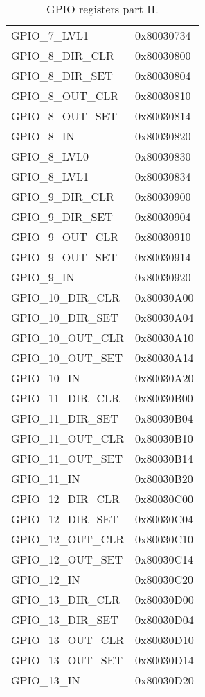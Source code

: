 \begin{table}[h]
{\begin{small}
\begin{center}
\begin{tabular}{l | l}
GPIO\_7\_LVL1       & 0x80030734\\
GPIO\_8\_DIR\_CLR    & 0x80030800\\
GPIO\_8\_DIR\_SET    & 0x80030804\\
GPIO\_8\_OUT\_CLR    & 0x80030810\\
GPIO\_8\_OUT\_SET    & 0x80030814\\
GPIO\_8\_IN         & 0x80030820\\
GPIO\_8\_LVL0       & 0x80030830\\
GPIO\_8\_LVL1       & 0x80030834\\
GPIO\_9\_DIR\_CLR    & 0x80030900\\
GPIO\_9\_DIR\_SET    & 0x80030904\\
GPIO\_9\_OUT\_CLR    & 0x80030910\\
GPIO\_9\_OUT\_SET    & 0x80030914\\
GPIO\_9\_IN         & 0x80030920\\
GPIO\_10\_DIR\_CLR   & 0x80030A00\\
GPIO\_10\_DIR\_SET   & 0x80030A04\\
GPIO\_10\_OUT\_CLR   & 0x80030A10\\
GPIO\_10\_OUT\_SET   & 0x80030A14\\
GPIO\_10\_IN        & 0x80030A20\\
GPIO\_11\_DIR\_CLR   & 0x80030B00\\
GPIO\_11\_DIR\_SET   & 0x80030B04\\
GPIO\_11\_OUT\_CLR   & 0x80030B10\\
GPIO\_11\_OUT\_SET   & 0x80030B14\\
GPIO\_11\_IN        & 0x80030B20\\
GPIO\_12\_DIR\_CLR   & 0x80030C00\\
GPIO\_12\_DIR\_SET   & 0x80030C04\\
GPIO\_12\_OUT\_CLR   & 0x80030C10\\
GPIO\_12\_OUT\_SET   & 0x80030C14\\
GPIO\_12\_IN        & 0x80030C20\\
GPIO\_13\_DIR\_CLR   & 0x80030D00\\
GPIO\_13\_DIR\_SET   & 0x80030D04\\
GPIO\_13\_OUT\_CLR   & 0x80030D10\\
GPIO\_13\_OUT\_SET   & 0x80030D14\\
GPIO\_13\_IN        & 0x80030D20\\
	\end{tabular}
\end{center}
		\end{small}
	}
	\caption{GPIO registers part II.}
	\label{register_map_4}
\end{table}